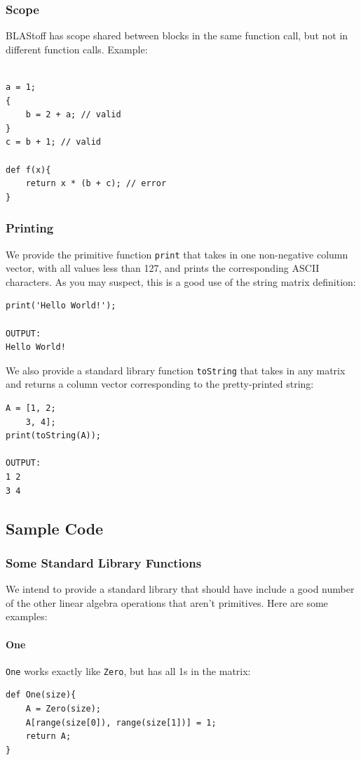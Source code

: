 \subsubsection{Scope}
BLAStoff has scope shared between blocks in the same function call, but not in different function calls.   Example:
\begin{lstlisting}

a = 1;
{
    b = 2 + a; // valid
}
c = b + 1; // valid

def f(x){
    return x * (b + c); // error
}
\end{lstlisting}

\subsubsection{Printing}
We provide the primitive function \verb=print= that takes in one non-negative column vector, with all values less than 127, and prints the corresponding ASCII characters.  As you may suspect, this is a good use of the string matrix definition:
\begin{lstlisting}
print('Hello World!');

OUTPUT:
Hello World!
\end{lstlisting}
We also provide a standard library function \verb=toString= that takes in any matrix and returns a column vector corresponding to the pretty-printed string:
\begin{lstlisting}
A = [1, 2;
    3, 4];
print(toString(A));

OUTPUT:
1 2
3 4
\end{lstlisting}

\subsection{Sample Code}

\subsubsection{Some Standard Library Functions}
We intend to provide a standard library that should have include a good number of the other linear algebra operations that aren't primitives.  Here are some examples:

\paragraph{One}
\verb=One= works exactly like \verb=Zero=, but has all 1s in the matrix:
\begin{lstlisting}
def One(size){
    A = Zero(size);
    A[range(size[0]), range(size[1])] = 1;
    return A;
}
\end{lstlisting}


